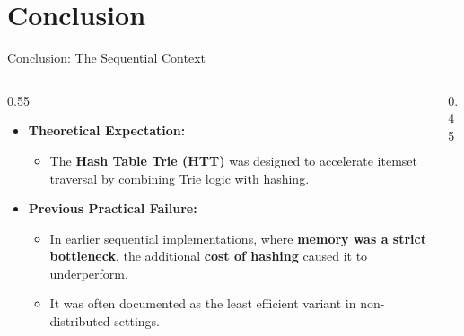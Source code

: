 
\section{Conclusion}

\begin{frame}{Conclusion: The Sequential Context}
    \begin{columns}[T]
        \begin{column}{0.55\textwidth}
            \begin{itemize}
                \item \textbf{Theoretical Expectation:} 
                \begin{itemize}
                    \item The \textbf{Hash Table Trie (HTT)} was designed to accelerate itemset traversal by combining Trie logic with hashing.
                \end{itemize}
                \vfill
                \item \textbf{Previous Practical Failure:} 
                \begin{itemize}
                    \item In earlier sequential implementations, where \textbf{memory was a strict bottleneck}, the additional \textbf{cost of hashing} caused it to underperform.
                    \item It was often documented as the least efficient variant in non-distributed settings.
                \end{itemize}
            \end{itemize}
        \end{column}
        
        \begin{column}{0.45\textwidth}
            \centering
        \end{column}
    \end{columns}
\end{frame}

